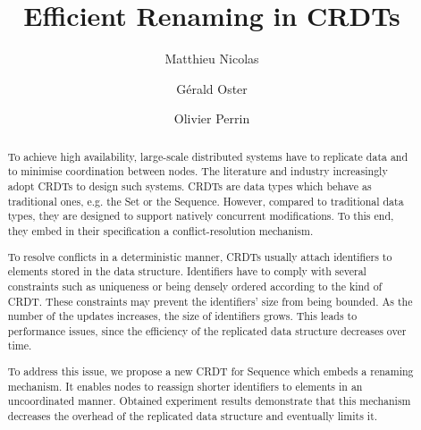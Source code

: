 \documentclass[sigplan,10pt]{acmart}
\begin{document}
\title{Efficient Renaming in \acp{CRDT}}

\author{Matthieu Nicolas}

\author{Gérald Oster}

\author{Olivier Perrin}

\begin{abstract}
To achieve high availability, large-scale distributed systems have to replicate data and to minimise coordination between nodes.
The literature and industry increasingly adopt \acfp{CRDT} to design such systems.
\acp{CRDT} are data types which behave as traditional ones, e.g. the Set or the Sequence.
However, compared to traditional data types, they are designed to support natively concurrent modifications.
To this end, they embed in their specification a conflict-resolution mechanism.

To resolve conflicts in a deterministic manner, CRDTs usually attach identifiers to elements stored in the data structure.
Identifiers have to comply with several constraints such as uniqueness or being densely ordered according to the kind of CRDT.
These constraints may prevent the identifiers’ size from being bounded.
As the number of the updates increases, the size of identifiers grows.
This leads to performance issues, since the efficiency of the replicated data structure decreases over time.

To address this issue, we propose a new CRDT for Sequence which embeds a renaming mechanism.
It enables nodes to reassign shorter identifiers to elements in an uncoordinated manner.
Obtained experiment results demonstrate that this mechanism decreases the overhead of the replicated data structure and eventually limits it.
\end{abstract}


\maketitle
\end{document}
